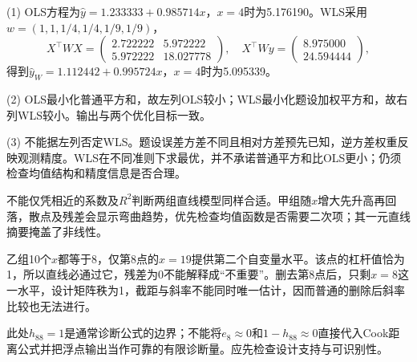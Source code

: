(1) OLS方程为$\widehat y=1.233333+0.985714x$，$x=4$时为5.176190。WLS采用$w=(1,1,1/4,1/4,1/9,1/9)$，\[X^\top WX=\begin{pmatrix}2.722222&5.972222\\5.972222&18.027778\end{pmatrix},\quad X^\top Wy=\begin{pmatrix}8.975000\\24.594444\end{pmatrix},\]得到$\widehat y_W=1.112442+0.995724x$，$x=4$时为5.095339。\par (2) OLS最小化普通平方和，故左列OLS较小；WLS最小化题设加权平方和，故右列WLS较小。输出与两个优化目标一致。\par{}(3) 不能据左列否定WLS。题设误差方差不同且相对方差预先已知，逆方差权重反映观测精度。WLS在不同准则下求最优，并不承诺普通平方和比OLS更小；仍须检查均值结构和精度信息是否合理。
\par\nobreak\smallskip{}

不能仅凭相近的系数及$R^2$判断两组直线模型同样合适。甲组随$x$增大先升高再回落，散点及残差会显示弯曲趋势，优先检查均值函数是否需要二次项；其一元直线摘要掩盖了非线性。\par 乙组10个$x$都等于8，仅第8点的$x=19$提供第二个自变量水平。该点的杠杆值恰为1，所以直线必通过它，残差为0不能解释成“不重要”。删去第8点后，只剩$x=8$这一水平，设计矩阵秩为1，截距与斜率不能同时唯一估计，因而普通的删除后斜率比较也无法进行。\par 此处$h_{88}=1$是通常诊断公式的边界；不能将$e_8\approx0$和$1-h_{88}\approx0$直接代入Cook距离公式并把浮点输出当作可靠的有限诊断量。应先检查设计支持与可识别性。
\par\nobreak\smallskip{}
